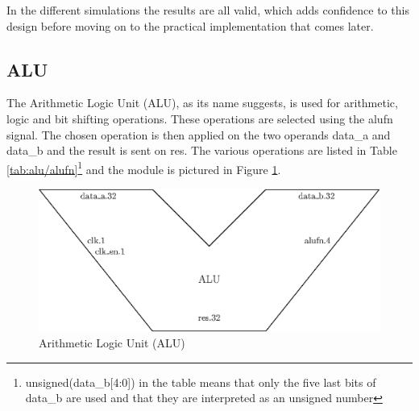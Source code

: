 In the different simulations the results are all valid, which adds confidence to this design before 
moving on to the practical implementation that comes later.

\subsection{ALU}

The Arithmetic Logic Unit (ALU), as its name suggests, is used for arithmetic, logic and bit shifting 
operations. These operations are selected using the alufn signal. The chosen operation is then 
applied on the two operands data\_a and data\_b and the result is sent on res. The various
operations are listed in Table \ref{tab:alu/alufn}\footnote{unsigned(data\_b[4:0]) in the table means 
that only the five last bits of data\_b are used and that they are interpreted as an unsigned number
} and the module is pictured in Figure \ref{fig:components/alu}. 

\begin{figure}[ht]
    \centering
    \includegraphics[scale=0.8]{Chapter3-CPU/res/alu}
    \caption{Arithmetic Logic Unit (ALU)}
    \label{fig:components/alu}
\end{figure}

